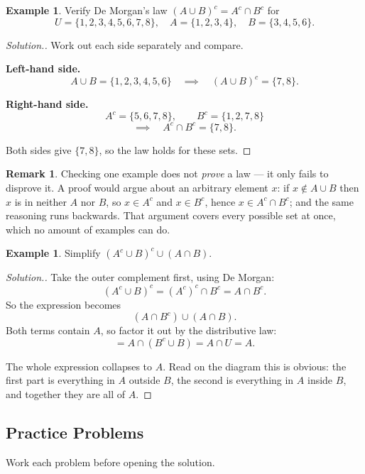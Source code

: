 \documentclass[11pt,a4paper]{article}
\theoremstyle{definition}
\newtheorem{example}[thm]{Example}
\newtheorem{remark}[thm]{Remark}
\newenvironment{solution}
  {\renewcommand{\qedsymbol}{}\begin{proof}[\textit{Solution}.]}
  {\end{proof}}
\begin{document}
\begin{example}
Verify De Morgan's law $(A\cup B)^c=A^c\cap B^c$ for
$$U=\{1,2,3,4,5,6,7,8\},\quad A=\{1,2,3,4\},\quad B=\{3,4,5,6\}.$$
\end{example}

\begin{solution}
Work out each side separately and compare.

\textbf{Left-hand side.}
$$A\cup B=\{1,2,3,4,5,6\}\quad\implies\quad (A\cup B)^c=\{7,8\}.$$

\textbf{Right-hand side.}
$$A^c=\{5,6,7,8\},\qquad B^c=\{1,2,7,8\}$$
$$\implies\quad A^c\cap B^c=\{7,8\}.$$

Both sides give $\{7,8\}$, so the law holds for these sets.
\end{solution}

\begin{remark}
Checking one example does not \emph{prove} a law --- it only fails to disprove it. A
proof would argue about an arbitrary element $x$: if $x\notin A\cup B$ then $x$ is in
neither $A$ nor $B$, so $x\in A^c$ and $x\in B^c$, hence $x\in A^c\cap B^c$; and the
same reasoning runs backwards. That argument covers every possible set at once, which
no amount of examples can do.
\end{remark}

\begin{example}
Simplify $\left(A^c\cup B\right)^c\cup\left(A\cap B\right)$.
\end{example}

\begin{solution}
Take the outer complement first, using De Morgan:
$$\left(A^c\cup B\right)^c=\left(A^c\right)^c\cap B^c=A\cap B^c.$$
So the expression becomes
$$\left(A\cap B^c\right)\cup\left(A\cap B\right).$$
Both terms contain $A$, so factor it out by the distributive law:
$$=A\cap\left(B^c\cup B\right)=A\cap U=A.$$

The whole expression collapses to $A$. Read on the diagram this is obvious: the first
part is everything in $A$ outside $B$, the second is everything in $A$ inside $B$, and
together they are all of $A$.
\end{solution}


\subsection{Practice Problems}

Work each problem before opening the solution.
\end{document}

